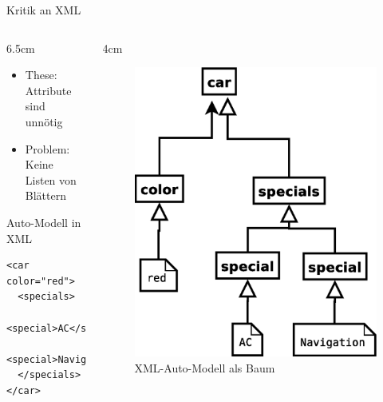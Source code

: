 \documentclass{beamer}
\begin{document}
\begin{frame}[fragile]{Kritik an XML}
  \begin{columns}
    \begin{column}{6.5cm}
      \begin{itemize}
      \item These: Attribute sind unnötig
      \item Problem: Keine Listen von Blättern
      \end{itemize}
      \begin{block}{Auto-Modell in XML}
\begin{verbatim}
<car color="red">
  <specials>
    <special>AC</special>
    <special>Navigation</special>
  </specials>
</car>        
\end{verbatim}
      \end{block}
    \end{column}
    \begin{column}{4cm}
      \begin{figure}
        \centering
        \includegraphics[scale=0.3]{images/car_xml}
        \caption{XML-Auto-Modell als Baum}
      \end{figure}    
    \end{column}
  \end{columns}
\end{frame}
\end{document}
